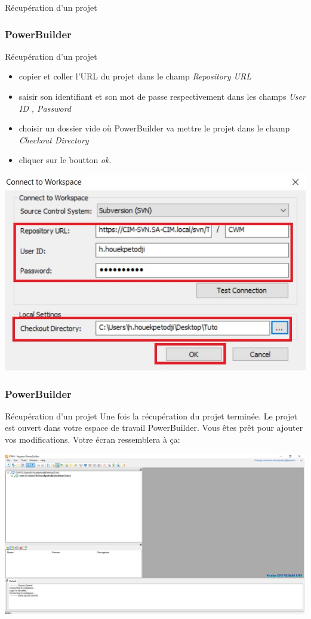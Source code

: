 \documentclass{beamer}
\begin{document}
\begin{frame}
\begin{center}
\huge{Récupération d'un projet}
\end{center}
\end{frame}


\begin{frame}
\frametitle{PowerBuilder}
\begin{block}{Récupération d'un projet}
\begin{itemize}
\item copier et coller l'URL du projet dans le champ \alert{\textit{Repository URL}}
\item saisir son identifiant et son mot de passe respectivement dans les champs \alert{\textit{User ID , Password}}
\item choisir un dossier vide où PowerBuilder va mettre le projet dans le champ \alert{\textit{Checkout Directory}}
\item cliquer sur le boutton \alert{\textit{ok}}. 
\end{itemize}
\end{block}
\includegraphics[scale=0.4]{../images/connect2.jpg}
\end{frame}
\begin{frame} 
\frametitle{PowerBuilder}
\begin{block}{Récupération d'un projet}
Une fois la récupération du projet terminée. Le projet est ouvert dans votre espace de travail PowerBuilder. Vous êtes prêt pour ajouter vos modifications. Votre écran ressemblera à ça:

\end{block}
\includegraphics[scale=0.25]{../images/connect3.jpg}
\end{frame}
\end{document}
